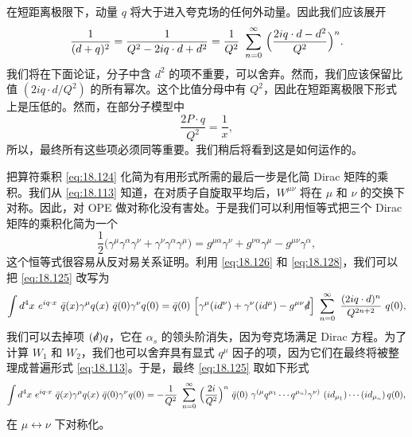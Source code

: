 在短距离极限下，动量 $q$ 将大于进入夸克场的任何外动量。因此我们应该展开
\begin{equation}
  \frac{1}{(d+q)^2} = \frac{1}{Q^2 - 2iq\cdot d + d^2}
  = \frac{1}{Q^2}\ \sum_{n=0}^{\infty}\ \Bigl( \frac{2iq\cdot d - d^2}
    {Q^2} \Bigr)^n .
  \label{eq:18.126}
\end{equation}
我们将在下面论证，分子中含 $d^2$ 的项不重要，可以舍弃。然而，我们应该保留比值 $(2iq\cdot d/Q^2)$ 的所有幂次。这个比值分母中有 $Q^2$，因此在短距离极限下形式上是压低的。然而，在部分子模型中
\begin{equation}
  \frac{2P\cdot q}{Q^2} = \frac{1}{x} ,
  \label{eq:18.127}
\end{equation}
所以，最终所有这些项必须同等重要。我们稍后将看到这是如何运作的。

把算符乘积 \eqref{eq:18.124} 化简为有用形式所需的最后一步是化简 Dirac 矩阵的乘积。我们从 \eqref{eq:18.113} 知道，在对质子自旋取平均后，$W^{\mu\nu}$ 将在 $\mu$ 和 $\nu$ 的交换下对称。因此，对 OPE 做对称化没有害处。于是我们可以利用恒等式把三个 Dirac 矩阵的乘积化简为一个
\begin{equation}
  \frac{1}{2}\bigl( \gamma^\mu\gamma^\alpha\gamma^\nu + \gamma^\nu
    \gamma^\alpha\gamma^\mu \bigr) = g^{\mu\alpha}\gamma^\nu + g^{\nu\alpha}
    \gamma^\mu - g^{\mu\nu}\gamma^\alpha ,
  \label{eq:18.128}
\end{equation}
这个恒等式很容易从反对易关系证明。利用 \eqref{eq:18.126} 和 \eqref{eq:18.128}，我们可以把 \eqref{eq:18.125} 改写为
\begin{equation}
  \int d^4x\ e^{iq\cdot x}\ \bar{q}(x)\gamma^\mu q(x)\ \bar{q}(0)\gamma^\nu
    q(0) = \bar{q}(0)\ \Bigl[ \gamma^\mu(i d^\nu) + \gamma^\nu(i d^\mu)
      - g^{\mu\nu}\slashed{d} \Bigr]\ \sum_{n=0}^{\infty}\ \frac{(2iq\cdot d)^n}
        {Q^{2n+2}}\ q(0) ,
  \label{eq:18.129}
\end{equation}
我们可以去掉项 $(\slashed{d})q$，它在 $\alpha_s$ 的领头阶消失，因为夸克场满足 Dirac 方程。为了计算 $W_1$ 和 $W_2$，我们也可以舍弃具有显式 $q^\mu$ 因子的项，因为它们在最终将被整理成普遍形式 \eqref{eq:18.113}。于是，最终 \eqref{eq:18.125} 取如下形式
\begin{equation}
  \int d^4x\ e^{iq\cdot x}\ \bar{q}(x)\gamma^\mu q(x)\ \bar{q}(0)\gamma^\nu
    q(0) = -\frac{1}{Q^2}\ \sum_{n=0}^{\infty}\ \Bigl( \frac{2i}{Q^2}
      \Bigr)^n\ \bar{q}(0)\ \gamma^{(\mu}q^{\mu_1}\cdots q^{\mu_n)}
      \gamma^{\nu)}\ (id_{\mu_1})\cdots(id_{\mu_n})\,q(0) ,
  \label{eq:18.130}
\end{equation}
在 $\mu\leftrightarrow\nu$ 下对称化。

